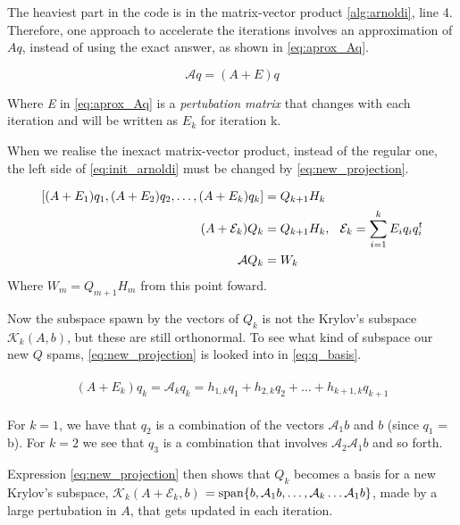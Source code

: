 The heaviest part in the code is in the matrix-vector product \ref{alg:arnoldi}, line 4. Therefore, one approach to accelerate the iterations involves an approximation of $Aq $, instead of using the exact answer, as shown in \ref{eq:aprox_Aq}.

\begin{equation}\label{eq:aprox_Aq}
    \mathcal{A}q = (A + E)q
\end{equation}

Where \textit{E} in \ref{eq:aprox_Aq} is a \textit{pertubation matrix} that changes with each iteration and will be written as $E_{k}$ for iteration k.

When we realise the inexact matrix-vector product, instead of the regular one, the left side of \ref{eq:init_arnoldi} must be changed by \ref{eq:new_projection}.


\begin{align} \label{eq:new_projection}
    \begin{split}
        [(A + E_{1})q_{1}, (A + E_{2})q_{2},\dots, (A + E_{k})q_{k}] &= Q_{k+1}H_{k}\\
        (A + \mathcal{E}_{k})Q_{k} &= Q_{k+1}H_{k}, \hspace{0.1in} \mathcal{E}_{k} = \sum_{i=1}^{k}E_{i}q_{i}q_{i}^{t}\\
        \mathcal{A}Q_{k} &= W_{k}
    \end{split}
\end{align}
Where $W_{m} = Q_{m+1}H_{m}$ from this point foward.

Now the subspace spawn by the vectors of $Q_{k}$ is not the Krylov's subspace $\mathcal{K}_{k}(A,b)$, but these are still orthonormal.  To see what kind of subspace our new $Q$ spams, \ref{eq:new_projection} is looked into in \ref{eq:q_basis}.

\begin{align}\label{eq:q_basis}
    \begin{split}
        (A + E_{k})q_{k}=\mathcal{A}_{k} q_{k} = h_{1,k}q_{1} + h_{2,k}q_{2} + \dots + h_{k+1,k}q_{k+1}
    \end{split}
\end{align}

For $k=1$, we have that $q_{2}$ is a combination of the vectors $\mathcal{A}_{1}b$ and $b$ (since $q_{1}$ = b). For $k=2$ we see that $q_{3}$ is a combination that involves $\mathcal{A}_{2} \mathcal{A}_{1}b$ and so forth.

Expression \ref{eq:new_projection} then shows that $Q_{k}$ becomes a basis for a new Krylov's subspace, $\mathcal{K}_{k}(A+\mathcal{E}_{k},b)$ $= \operatorname{span} \{b,\mathcal{A}_{1}b,\dots, \mathcal{A}_{k}\dots\mathcal{A}_{1}b \}$, made by a large pertubation in $A$, that gets updated in each iteration.

